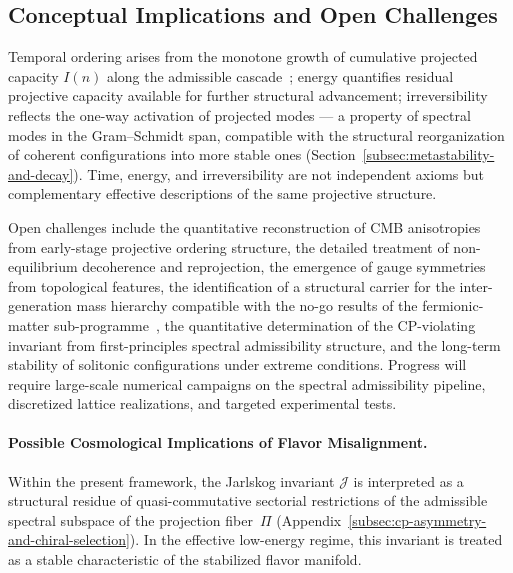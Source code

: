 \subsection{Conceptual Implications and Open Challenges}
  \label{subsec:conceptual-implications-and-open-challenges}

  Temporal ordering arises from the monotone growth of cumulative projected
  capacity $I(n)$ along the admissible cascade~\cite{Beau2026pto};
  energy quantifies residual projective capacity available for further structural
  advancement; irreversibility reflects the one-way activation of projected
  modes --- a property of spectral modes in the Gram--Schmidt span, compatible
  with the structural reorganization of coherent configurations into more stable
  ones (Section~\ref{subsec:metastability-and-decay}).
  Time, energy, and irreversibility are not independent axioms but complementary
  effective descriptions of the same projective structure.

  Open challenges include the quantitative reconstruction of CMB anisotropies from
  early-stage projective ordering structure, the detailed treatment of non-equilibrium
  decoherence and reprojection, the emergence of gauge symmetries from topological
  features, the identification of a structural carrier for the inter-generation mass
  hierarchy compatible with the no-go results of the fermionic-matter
  sub-programme~\cite{Beau2026pyo,Beau2026fmnote}, the quantitative
  determination of the CP-violating invariant from first-principles spectral admissibility
  structure, and the long-term stability of solitonic configurations under extreme
  conditions.
  Progress will require large-scale numerical campaigns on the spectral admissibility
  pipeline, discretized lattice realizations, and targeted experimental tests.

  \paragraph{Possible Cosmological Implications of Flavor Misalignment.}

    Within the present framework, the Jarlskog invariant $\mathcal{J}$ is interpreted
    as a structural residue of quasi-commutative sectorial restrictions of the admissible
    spectral subspace of the projection fiber~$\Pi$
    (Appendix~\ref{subsec:cp-asymmetry-and-chiral-selection}).
    In the effective low-energy regime, this invariant is treated as
    a stable characteristic of the stabilized flavor manifold.

